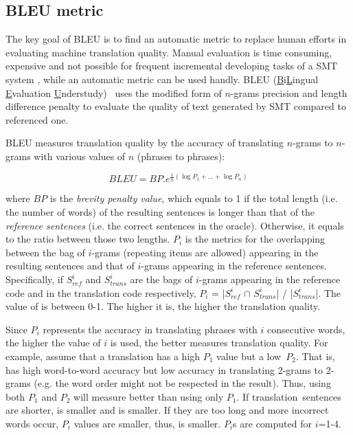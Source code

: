 \subsection{BLEU metric}

The key goal of BLEU is to find an automatic metric to replace human
efforts in evaluating machine translation quality. Manual evaluation
is time consuming, expensive and not possible for frequent incremental
developing tasks of a SMT system \cite{Papineni2002}, while an
automatic metric can be used handly. BLEU
(\underline{B}i\underline{L}ingual \underline{E}valuation
\underline{U}nderstudy)~\cite{Papineni2002} uses the modified form of $n$-grams precision
and length difference penalty to evaluate the quality of text
generated by SMT compared to referenced one.

BLEU measures
translation quality by the accuracy of translating $n$-grams to
$n$-grams with various values of $n$ (phrases to phrases):

\[BLEU = BP.{e^{\frac{1}{n}(\log {P_1} + ... + \log {P_n})}}\]

where $BP$ is the {\em brevity penalty value}, which equals to 1 if
the total length (i.e. the number of words) of the resulting sentences
is longer than that of the {\em reference sentences} (i.e. the correct
sentences in the oracle). Otherwise, it equals to the ratio between
those two lengths. $P_i$ is the metrics for the overlapping between
the bag of $i$-grams (repeating items are allowed) appearing in the
resulting sentences and that of $i$-grams appearing in the reference
sentences. Specifically, if $S^{i}_{ref}$ and $S^{i}_{trans}$ are the
bags of $i$-grams appearing in the reference code and in the
translation code respectively, $P_i$ = |$S^{i}_{ref}$ $\cap$
$S^{i}_{trans}$| / |$S^{i}_{trans}$|. The value of  is
between 0-1. The higher it is, the higher the translation quality.

Since $P_i$ represents the accuracy in translating phrases
with $i$ consecutive words, the higher the value of $i$ is used, the
better  measures translation quality. For example, assume
that a translation  has a high $P_1$ value but a
low~$P_2$. That is,  has high word-to-word accuracy but low
accuracy in translating 2-grams to 2-grams (e.g. the word order might
not be respected in the result). Thus, using both $P_1$ and $P_2$ will
measure  better than using only $P_1$. If
translation~sen\-tences are shorter,  is smaller and
 is smaller. If they are too long and more incorrect words
occur, $P_i$ values are smaller, thus,  is smaller. $P_i$s
are computed for $i$=1-4.
